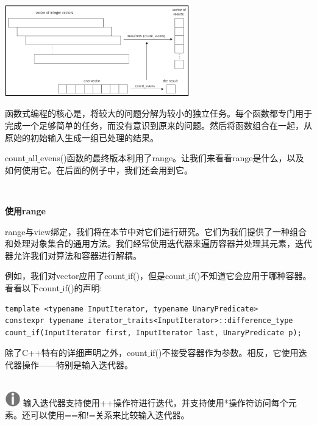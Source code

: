 \begin{center}
	\includegraphics[width=0.6\textwidth]{content/Section-2/Chapter-7/3}
\end{center}

函数式编程的核心是，将较大的问题分解为较小的独立任务。每个函数都专门用于完成一个足够简单的任务，而没有意识到原来的问题。然后将函数组合在一起，从原始的初始输入生成一组已处理的结果。 \par
count\underline{ }all\underline{ }evens()函数的最终版本利用了range。让我们来看看range是什么，以及如何使用它。在后面的例子中，我们还会用到它。 \par

\noindent\textbf{}\ \par
\textbf{使用range} \ \par
range与view绑定，我们将在本节中对它们进行研究。它们为我们提供了一种组合和处理对象集合的通用方法。我们经常使用迭代器来遍历容器并处理其元素，迭代器允许我们对算法和容器进行解耦。 \par
例如，我们对vector应用了count\underline{ }if()，但是count\underline{ }if()不知道它会应用于哪种容器。看看以下count\underline{ }if()的声明: \par

\begin{lstlisting}[caption={}]
template <typename InputIterator, typename UnaryPredicate>
constexpr typename iterator_traits<InputIterator>::difference_type
count_if(InputIterator first, InputIterator last, UnaryPredicate p);
\end{lstlisting}

除了C++特有的详细声明之外，count\underline{ }if()不接受容器作为参数。相反，它使用迭代器操作——特别是输入迭代器。 \par

\hspace*{\fill} \\ %
\includegraphics[width=0.05\textwidth]{images/warn}
输入迭代器支持使用++操作符进行迭代，并支持使用*操作符访问每个元素。还可以使用==和!=关系来比较输入迭代器。 \par
\noindent\textbf{}\ \par

